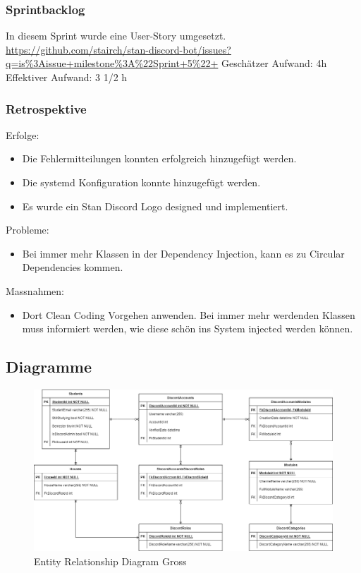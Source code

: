 \documentclass[a4paper, table]{article}
\begin{document}
\subsubsection*{Sprintbacklog}
In diesem Sprint wurde eine User-Story umgesetzt.\\
\url{https://github.com/stairch/stan-discord-bot/issues?q=is%3Aissue+milestone%3A%22Sprint+5%22+}
\newline
Geschätzer Aufwand: 4h
\newline
Effektiver Aufwand: 3 1/2 h

\subsubsection*{Retrospektive}
Erfolge:
\begin{itemize}
    \item Die Fehlermitteilungen konnten erfolgreich hinzugefügt werden.
    \item Die systemd Konfiguration konnte hinzugefügt werden.
    \item Es wurde ein Stan Discord Logo designed und implementiert.
\end{itemize}
Probleme:
\begin{itemize}
    \item Bei immer mehr Klassen in der Dependency Injection, kann es zu Circular Dependencies kommen.
\end{itemize}
Massnahmen:
\begin{itemize}
    \item Dort Clean Coding Vorgehen anwenden. 
    Bei immer mehr werdenden Klassen muss informiert werden, wie diese schön ins System injected werden können.
\end{itemize}

\subsection{Diagramme}
\begin{landscape}
    \begin{figure}[hb]
        \centering
        \hspace*{-4.5cm}
        \includegraphics[width=1.6\textwidth]{img/ER-Diagramm.png}
        \caption{Entity Relationship Diagram Gross}
        \label{fig:ER-Diagram-big}
    \end{figure}
\end{landscape}
\end{document}
